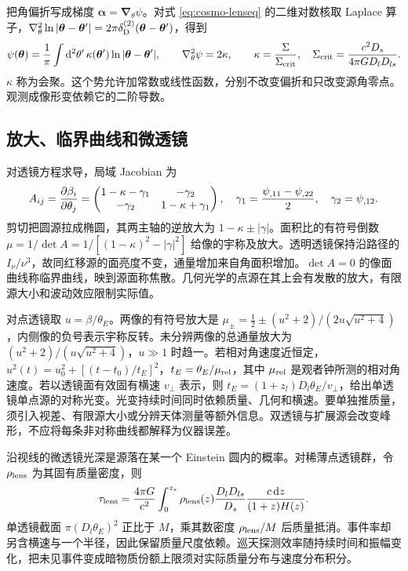 把角偏折写成梯度 $\bm\alpha=\bm\nabla_\theta\psi$。对式 \eqref{eq:cosmo-lenseq} 的二维对数核取 Laplace 算子，$\nabla_\theta^2\ln|\bm\theta-\bm\theta'|=2\pi\delta_{\rm D}^{(2)}(\bm\theta-\bm\theta')$，得到
\[
 \psi(\bm\theta)=\frac1\pi\int \dd^2\theta'\,\kappa(\bm\theta')
                      \ln|\bm\theta-\bm\theta'|,\qquad
 \nabla_\theta^2\psi=2\kappa,\qquad
 \kappa=\frac{\Sigma}{\Sigma_{\rm crit}},
 \quad \Sigma_{\rm crit}=\frac{c^2D_s}{4\pi GD_lD_{ls}}.
\]
$\kappa$ 称为会聚。这个势允许加常数或线性函数，分别不改变偏折和只改变源角零点。观测成像形变依赖它的二阶导数。

\subsection{放大、临界曲线和微透镜}

对透镜方程求导，局域 Jacobian 为
\[
 A_{ij}=\frac{\partial\beta_i}{\partial\theta_j}
 =\begin{pmatrix}1-\kappa-\gamma_1&-\gamma_2\\-\gamma_2&1-\kappa+\gamma_1\end{pmatrix},
 \quad
 \gamma_1=\frac{\psi_{,11}-\psi_{,22}}2,\quad \gamma_2=\psi_{,12}.
\]
剪切把圆源拉成椭圆，其两主轴的逆放大为 $1-\kappa\pm|\gamma|$。面积比的有符号倒数 $\mu=1/\det A=1/[(1-\kappa)^2-|\gamma|^2]$ 给像的宇称及放大。透明透镜保持沿路径的 $I_\nu/\nu^3$，故同红移源的面亮度不变，通量增加来自角面积增加。$\det A=0$ 的像面曲线称临界曲线，映到源面称焦散。几何光学的点源在其上会有发散的放大，有限源大小和波动效应限制实际值。

对点透镜取 $u=\beta/\theta_E$。两像的有符号放大是 $\mu_\pm=\frac12\pm(u^2+2)/(2u\sqrt{u^2+4})$，内侧像的负号表示宇称反转。未分辨两像的总通量放大为 $(u^2+2)/(u\sqrt{u^2+4})$，$u\gg1$ 时趋一。若相对角速度近恒定，$u^2(t)=u_0^2+[(t-t_0)/t_E]^2$，$t_E=\theta_E/\mu_{\rm rel}$，其中 $\mu_{\rm rel}$ 是观者钟所测的相对角速度。若以透镜面有效固有横速 $v_\perp$ 表示，则 $t_E=(1+z_l)D_l\theta_E/v_\perp$，给出单透镜单点源的对称光变。光变持续时间同时依赖质量、几何和横速。要单独推质量，须引入视差、有限源大小或分辨天体测量等额外信息。双透镜与扩展源会改变峰形，不应将每条非对称曲线都解释为仪器误差。

沿视线的微透镜光深是源落在某一个 Einstein 圆内的概率。对稀薄点透镜群，令 $\rho_{\rm lens}$ 为其固有质量密度，则
\[
 \tau_{\rm lens}=\frac{4\pi G}{c^2}\int_0^{z_s}
       \rho_{\rm lens}(z)\frac{D_lD_{ls}}{D_s}
             \frac{c\,\dd z}{(1+z)H(z)} .
\]
单透镜截面 $\pi(D_l\theta_E)^2$ 正比于 $M$，乘其数密度 $\rho_{\rm lens}/M$ 后质量抵消。事件率却另含横速与一个半径，因此保留质量尺度依赖。巡天探测效率随持续时间和振幅变化，把未见事件变成暗物质份额上限须对实际质量分布与速度分布积分。

